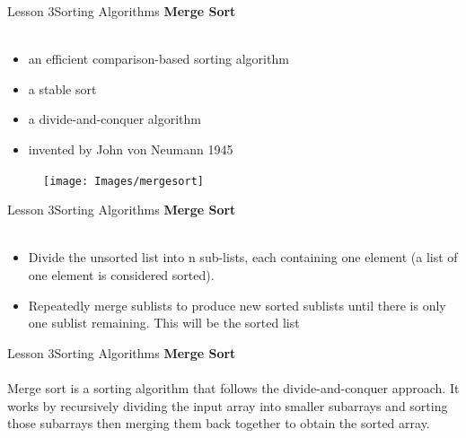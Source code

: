 \documentclass[aspectratio=1610]{beamer}
\begin{document}

\begin{frame}{Lesson 3}{Sorting Algorithms}
\LARGE
\textbf{Merge Sort}\\~\\
\begin{minipage}{0.65\textwidth}
\Large
\begin{itemize}
    \item an efficient comparison-based sorting algorithm
    \item a stable sort
    \item a divide-and-conquer algorithm 
    \item invented by John von Neumann 1945
\end{itemize}
  \end{minipage}
\begin{minipage}{.0\textwidth}
      \begin{figure}
        \texttt{[image: Images/mergesort]}
      \end{figure}
  \end{minipage}  
\end{frame}



\begin{frame}{Lesson 3}{Sorting Algorithms}
\LARGE
\textbf{Merge Sort}\\~\\
\begin{itemize}
\item Divide the unsorted list into n sub-lists, each containing one element (a list of one element is considered sorted).
\item Repeatedly merge sublists to produce new sorted sublists until there is only one sublist remaining. This will be the sorted list
\end{itemize}
\end{frame}


\begin{frame}{Lesson 3}{Sorting Algorithms}
\LARGE
\textbf{Merge Sort}\\~\\
Merge sort is a sorting algorithm that follows the divide-and-conquer 
approach. It works by recursively dividing the input array into 
smaller subarrays and sorting those subarrays then merging them back 
together to obtain the sorted array.
\end{frame}
\end{document}
